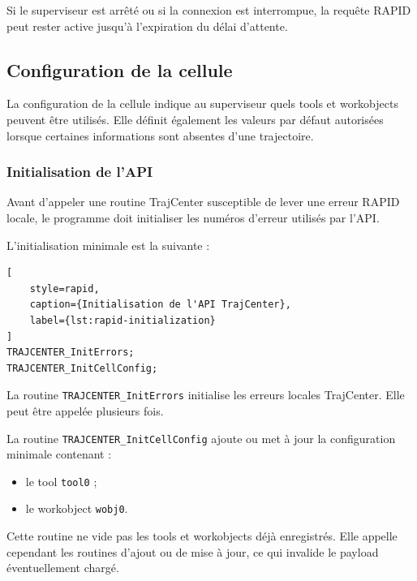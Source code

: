 \documentclass{rapportENSAM}
\begin{document}
Si le superviseur est arrêté ou si la connexion est interrompue, la requête
RAPID peut rester active jusqu'à l'expiration du délai d'attente.


\subsection{Configuration de la cellule}
\label{subsec:rapid-cell-configuration}

La configuration de la cellule indique au superviseur quels tools et
workobjects peuvent être utilisés. Elle définit également les valeurs par
défaut autorisées lorsque certaines informations sont absentes d'une
trajectoire.


\subsubsection{Initialisation de l'API}
\label{subsubsec:rapid-api-initialization}

Avant d'appeler une routine TrajCenter susceptible de lever une erreur RAPID
locale, le programme doit initialiser les numéros d'erreur utilisés par l'API.

L'initialisation minimale est la suivante :

\begin{lstlisting}[
    style=rapid,
    caption={Initialisation de l'API TrajCenter},
    label={lst:rapid-initialization}
]
TRAJCENTER_InitErrors;
TRAJCENTER_InitCellConfig;
\end{lstlisting}

La routine \texttt{TRAJCENTER\_InitErrors} initialise les erreurs locales
TrajCenter. Elle peut être appelée plusieurs fois.

La routine \texttt{TRAJCENTER\_InitCellConfig} ajoute ou met à jour la
configuration minimale contenant :

\begin{itemize}
    \item le tool \texttt{tool0} ;
    \item le workobject \texttt{wobj0}.
\end{itemize}

Cette routine ne vide pas les tools et workobjects déjà enregistrés. Elle
appelle cependant les routines d'ajout ou de mise à jour, ce qui invalide le
payload éventuellement chargé.
\end{document}
